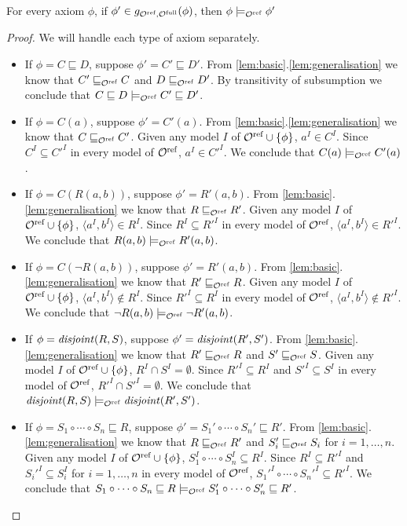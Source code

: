 \documentclass[
]{ceurart}
\begin{document}
\begin{lemma} \label{lem:weaker}
  For every \SROIQ axiom $\phi$, if $\phi' \in g_{{\mathcal{O}^\textnormal{ref}},{\mathcal{O}^\textnormal{full}}}(\phi)$, then $\phi \models_{\mathcal{O}^\textnormal{ref}} \phi'$
\end{lemma}

\begin{proof} We will handle each type of axiom separately.
  \begin{itemize}
    \item If $\phi = C \sqsubseteq D$, suppose $\phi' = C' \sqsubseteq D'$. From \cref{lem:basic}.\ref{lem:generalisation} we know that $C' \sqsubseteq_{\mathcal{O}^\textnormal{ref}} C$ and $D \sqsubseteq_{\mathcal{O}^\textnormal{ref}} D'$. By transitivity of subsumption we conclude that $C \sqsubseteq D \models_{\mathcal{O}^\textnormal{ref}} C' \sqsubseteq D'$.
    \item If $\phi = C(a)$, suppose $\phi' = C'(a)$. From \cref{lem:basic}.\ref{lem:generalisation} we know that $C \sqsubseteq_{\mathcal{O}^\textnormal{ref}} C'$. Given any model $I$ of ${\mathcal{O}^\textnormal{ref}} \cup \{ \phi \}$, $a^I \in C^I$. Since $C^I \subseteq C'^I$ in every model of ${\mathcal{O}^\textnormal{ref}}$, $a^I \in C'^I$. We conclude that $C(a) \models_{\mathcal{O}^\textnormal{ref}} C'(a)$.
    \item If $\phi = C(R(a, b))$, suppose $\phi' = R'(a, b)$. From \cref{lem:basic}.\ref{lem:generalisation} we know that $R \sqsubseteq_{\mathcal{O}^\textnormal{ref}} R'$. Given any model $I$ of ${\mathcal{O}^\textnormal{ref}} \cup \{ \phi \}$, $\langle a^I, b^I \rangle \in R^I$. Since $R^I \subseteq R'^I$ in every model of ${\mathcal{O}^\textnormal{ref}}$, $\langle a^I, b^I \rangle \in R'^I$. We conclude that $R(a, b) \models_{\mathcal{O}^\textnormal{ref}} R'(a, b)$.
    \item If $\phi = C(\lnot R(a, b))$, suppose $\phi' = R'(a, b)$. From \cref{lem:basic}.\ref{lem:generalisation} we know that $R' \sqsubseteq_{\mathcal{O}^\textnormal{ref}} R$. Given any model $I$ of ${\mathcal{O}^\textnormal{ref}} \cup \{ \phi \}$, $\langle a^I, b^I \rangle \not\in R^I$. Since $R'^I \subseteq R^I$ in every model of ${\mathcal{O}^\textnormal{ref}}$, $\langle a^I, b^I \rangle \not\in R'^I$. We conclude that $\lnot R(a, b) \models_{\mathcal{O}^\textnormal{ref}} \lnot R'(a, b)$.
    \item If $\phi = \mathit{disjoint}(R, S)$, suppose $\phi' = \mathit{disjoint}(R', S')$. From \cref{lem:basic}.\ref{lem:generalisation} we know that $R' \sqsubseteq_{\mathcal{O}^\textnormal{ref}} R$ and $S' \sqsubseteq_{\mathcal{O}^\textnormal{ref}} S$. Given any model $I$ of ${\mathcal{O}^\textnormal{ref}} \cup \{ \phi \}$, $R^I \cap S^I = \emptyset$. Since $R'^I \subseteq R^I$ and $S'^I \subseteq S^I$ in every model of ${\mathcal{O}^\textnormal{ref}}$, $R'^I \cap S'^I = \emptyset$. We conclude that $\mathit{disjoint}(R, S) \models_{\mathcal{O}^\textnormal{ref}} \mathit{disjoint}(R', S')$.
    \item If $\phi = S_1 \circ \cdots \circ S_n \sqsubseteq R$, suppose $\phi' = S_1' \circ \cdots \circ S_n' \sqsubseteq R'$. From \cref{lem:basic}.\ref{lem:generalisation} we know that $R \sqsubseteq_{\mathcal{O}^\textnormal{ref}} R'$ and $S_i' \sqsubseteq_{\mathcal{O}^\textnormal{ref}} S_i$ for $i = 1, \dots, n$. Given any model $I$ of ${\mathcal{O}^\textnormal{ref}} \cup \{ \phi \}$, $S_1^I \circ \cdots \circ S_n^I \subseteq R^I$. Since $R^I \subseteq R'^I$ and $S_i'^I \subseteq S_i^I$ for $i = 1, \dots, n$ in every model of ${\mathcal{O}^\textnormal{ref}}$, $S_1'^I \circ \cdots \circ S_n'^I \subseteq R'^I$. We conclude that $S_1 \circ \cdots \circ S_n \sqsubseteq R \models_{\mathcal{O}^\textnormal{ref}} S_1' \circ \cdots \circ S_n' \sqsubseteq R'$.
  \end{itemize}
\end{proof}
\end{document}

